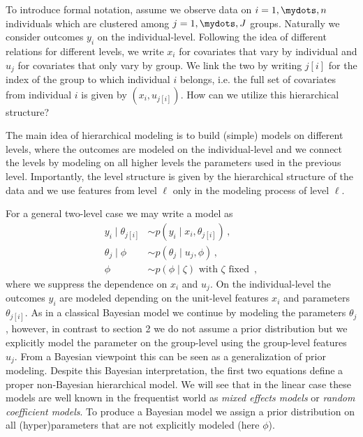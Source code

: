 \vspace{-10pt}
To introduce formal notation, assume we observe data on $i=1,\mydots,n$ individuals which are clustered among $j=1,\mydots,J$ groups.
Naturally we consider outcomes $y_i$ on the individual-level.
Following the idea of different relations for different levels, we write $x_i$ for covariates that vary by individual and $u_j$ for covariates that only vary by group.
We link the two by writing $j[i]$ for the index of the group to which individual $i$ belongs, i.e. the full set of covariates from individual $i$ is given by $(x_i, u_{j[i]})$.
How can we utilize this hierarchical structure?

The main idea of hierarchical modeling is to build (simple) models on different levels, where the outcomes are modeled on the individual-level and we connect the levels by modeling on all higher levels the parameters used in the previous level.
Importantly, the level structure is given by the hierarchical structure of the data and we use features from level $\ell$ only in the modeling process of level $\ell$.

For a general two-level case we may write a model as
\begin{align}
  y_i \mid \theta_{j[i]} &\sim p(y_i \mid x_i, \theta_{j[i]}) \,,\tag{Individual Level}\\
  \theta_j \mid \phi &\sim p(\theta_j \mid u_j, \phi) \,,\tag{Group Level}\\
  \phi &\sim p(\phi \mid \zeta) \text{ with } \zeta \text{ fixed } \,, \tag{Prior}
\end{align}
where we suppress the dependence on $x_i$ and $u_j$.
On the individual-level the outcomes $y_i$ are modeled depending on the unit-level features $x_i$ and parameters $\theta_{j[i]}$.
As in a classical Bayesian model we continue by modeling the parameters $\theta_j$, however, in contrast to section 2 we do not assume a prior distribution but we explicitly model the parameter on the group-level using the group-level features $u_j$.
From a Bayesian viewpoint this can be seen as a generalization of prior modeling.
Despite this Bayesian interpretation, the first two equations define a proper non-Bayesian hierarchical model.
We will see that in the linear case these models are well known in the frequentist world as \emph{mixed effects models} or \emph{random coefficient models}.
To produce a Bayesian model we assign a prior distribution on all (hyper)parameters that are not explicitly modeled (here $\phi$).

